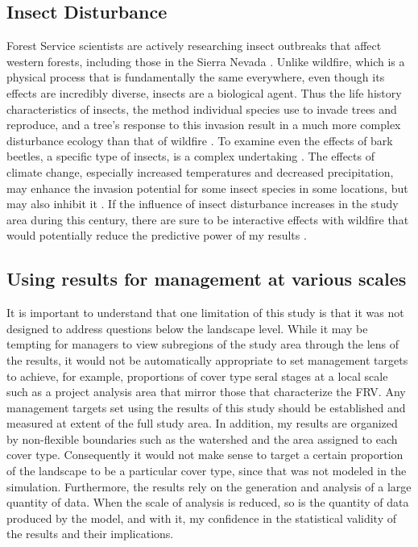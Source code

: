 \subsection*{Insect Disturbance}
Forest Service scientists are actively researching insect outbreaks that affect western forests, including those in the Sierra Nevada \citep{Liebhold2011}. Unlike wildfire, which is a physical process that is fundamentally the same everywhere, even though its effects are incredibly diverse, insects are a biological agent. Thus the life history characteristics of insects, the method individual species use to invade trees and reproduce, and a tree's response to this invasion result in a much more complex disturbance ecology than that of wildfire%
. To examine even the effects of bark beetles, a specific type of insects, is a complex undertaking \citep{Fettig2007}. The effects of climate change, especially increased temperatures and decreased precipitation, may enhance the invasion potential for some insect species in some locations, but may also inhibit it \citep{Logan2003,Bentz2010}. If the influence of insect disturbance increases in the study area during this century, there are sure to be interactive effects with wildfire that would potentially reduce the predictive power of my results \citep{Ferrell1996}.


\subsection*{Using results for management at various scales}
It is important to understand that one limitation of this study is that it was not designed to address questions below the landscape level. While it may be tempting for managers to view subregions of the study area through the lens of the results, it would not be automatically appropriate to set management targets to achieve, for example, proportions of cover type seral stages at a local scale such as a project analysis area that mirror those that characterize the FRV. Any management targets set using the results of this study should be established and measured at extent of the full study area. In addition, my results are organized by non-flexible boundaries such as the watershed and the area assigned to each cover type. Consequently it would not make sense to target a certain proportion of the landscape to be a particular cover type, since that was not modeled in the simulation. Furthermore, the results rely on the generation and analysis of a large quantity of data. When the scale of analysis is reduced, so is the quantity of data produced by the model, and with it, my confidence in the statistical validity of the results and their implications. 

